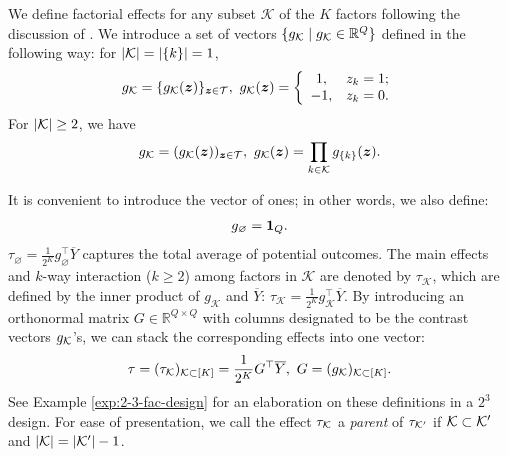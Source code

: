 \documentclass[12pt]{article}
\newtheorem{remark}{Remark}
\begin{document}
We define factorial effects for any subset $\mathcal{K}$ of the $K$ factors following the discussion of \cite{dasgupta2015causal,zhao2021regression, wu2011experiments}.   We introduce a set of vectors $\{g_{\mathcal{K}}\mid g_{\mathcal{K}}\in{\mathbb{R}}^Q\}$ defined in the following way: for $|{\mathcal{K}}| = |\{k\}| = 1$,
\begin{align*}
    g_{\mathcal{K}} = \{g_{\mathcal{K}}({\boldsymbol{z}})\}_{{\boldsymbol{z}}\in{\mathcal{T}}}, ~ g_{\mathcal{K}}({\boldsymbol{z}}) = \left\{
    \begin{array}{cc}
        1, & z_k = 1;  \\
        -1, & z_k = 0.
    \end{array}
    \right.
\end{align*}
For $|{\mathcal{K}}|\ge 2$, we have
\begin{align*}
    g_{\mathcal{K}} = (g_{\mathcal{K}}({\boldsymbol{z}}))_{{\boldsymbol{z}}\in{\mathcal{T}}}, ~g_{{\mathcal{K}}}({\boldsymbol{z}}) = \prod_{k\in{\mathcal{K}}} g_{\{k\}}({\boldsymbol{z}}).
\end{align*}


It is convenient to introduce the vector of ones; in other words, we also define:
\begin{align*}
   g_\varnothing = {\boldsymbol{1}}_{Q}.
\end{align*}
 $\tau_\varnothing = \frac{1}{2^K}g_\varnothing^\top \overline{Y}$ captures the total average of potential outcomes. The main effects and $k$-way interaction ($k \ge 2$) among factors in $\mathcal{K}$ are denoted by $\tau_{\mathcal{K}}$, which are defined by the inner product of $g_{\mathcal{K}}$ and $\overline{Y}$: $\tau_{\mathcal{K}} = \frac{1}{2^K} g_{\mathcal{K}}^\top \overline{Y}$. By introducing an orthonormal matrix ${G}\in\mathbb{R}^{Q\times Q}$ with columns designated to be the contrast vectors $g_{\mathcal{K}}$'s, we can stack the corresponding effects into one vector:
 \begin{align}\label{eqn:def-factorial-effects}
     \tau = (\tau_{\mathcal{K}})_{\mathcal{K}\subset [K]} = \frac{1}{2^K}{G}^\top \overline{Y}, ~ G = (g_{\mathcal{K}})_{{\mathcal{K}}\subset [K]}.
 \end{align}
See Example \ref{exp:2-3-fac-design} for an elaboration on these definitions in a $2^3$ design. For ease of presentation, we call the effect $\tau_{\mathcal{K}}$ a \textit{parent} of $\tau_{{\mathcal{K}}'}$ if ${\mathcal{K}}\subset{\mathcal{K}}'$ and $|{\mathcal{K}}| = |{\mathcal{K}}'| - 1$.
\end{document}
